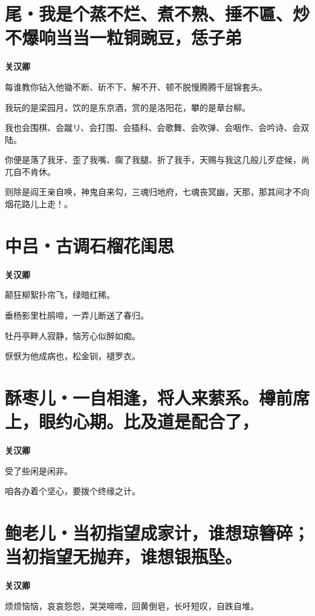 \documentclass[12pt,a4paper]{ctexbook}
\begin{document}
\section{尾・我是个蒸不烂、煮不熟、捶不匾、炒不爆响当当一粒铜豌豆，恁子弟}
\textbf{关汉卿}\par\vspace{0.5em}
每谁教你钻入他锄不断、斫不下、解不开、顿不脱慢腾腾千层锦套头。\par
我玩的是梁园月，饮的是东京酒，赏的是洛阳花，攀的是章台柳。\par
我也会围棋、会蹴リ、会打围、会插科、会歌舞、会吹弹、会咽作、会吟诗、会双陆。\par
你便是落了我牙、歪了我嘴、瘸了我腿、折了我手，天赐与我这几般儿歹症候，尚兀自不肯休。\par
则除是阎王亲自唤，神鬼自来勾，三魂归地府，七魂丧冥幽，天那，那其间才不向烟花路儿上走！。\par

\section{中吕・古调石榴花闺思}
\textbf{关汉卿}\par\vspace{0.5em}
颠狂柳絮扑帘飞，绿暗红稀。\par
垂杨影里杜鹃啼，一弄儿断送了春归。\par
牡丹亭畔人寂静，恼芳心似醉如痴。\par
恹恹为他成病也，松金钏，褪罗衣。\par

\section{酥枣儿・一自相逢，将人来萦系。樽前席上，眼约心期。比及道是配合了，}
\textbf{关汉卿}\par\vspace{0.5em}
受了些闲是闲非。\par
咱各办着个坚心，要拨个终缘之计。\par

\section{鲍老儿・当初指望成家计，谁想琼簪碎；当初指望无抛弃，谁想银瓶坠。}
\textbf{关汉卿}\par\vspace{0.5em}
烦烦恼恼，哀哀怨怨，哭哭啼啼，回黄倒皂，长吁短叹，自跌自堆。\par
\end{document}
